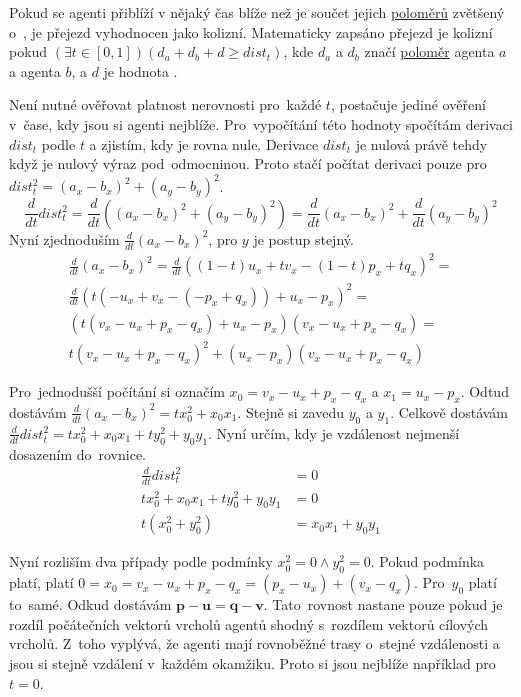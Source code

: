 Pokud se agenti přiblíží v nějaký čas blíže než je součet jejich \hyperref[par:polomer_agenta]{poloměrů}
zvětšený o~, je přejezd vyhodnocen jako kolizní.
Matematicky zapsáno přejezd je kolizní pokud $(\exists t\in[0, 1])(d_a + d_b + d \geq dist_t)$,
kde $d_a$ a $d_b$ značí \hyperref[par:polomer_agent]{poloměr} agenta $a$ a agenta $b$,
a $d$ je hodnota .

Není nutné ověřovat platnost nerovnosti pro~každé $t$, postačuje jediné ověření v~čase, kdy jsou si agenti nejblíže.
Pro~vypočítání této hodnoty spočítám derivaci $dist_t$ podle $t$ a zjistím, kdy je rovna nule.
Derivace $dist_t$ je nulová právě tehdy když je nulový výraz pod~odmocninou.
Proto stačí počítat derivaci pouze pro~$dist^2_t = (a_x - b_x)^2 + (a_y - b_y)^2$.
\[
	\frac{d}{dt} dist^2_t =
	\frac{d}{dt} \left(\left(a_x - b_x\right)^2 + \left(a_y - b_y\right)^2\right) =
	\frac{d}{dt} \left(a_x - b_x\right)^2 + \frac{d}{dt} \left(a_y - b_y\right)^2
\]
Nyní zjednoduším $\frac{d}{dt} (a_x - b_x)^2$, pro $y$ je postup stejný.
\begin{gather*}
	\frac{d}{dt} \left(a_x - b_x\right)^2 =
	\frac{d}{dt} \left(\left(1-t\right)u_x + tv_x - \left(1-t\right)p_x + tq_x\right)^2 =  \\
	\frac{d}{dt} \left(t\left(-u_x + v_x -\left(-p_x + q_x\right)\right) + u_x - p_x\right)^2 =  \\
	\left(t\left(v_x - u_x + p_x - q_x\right) + u_x - p_x\right)\left(v_x - u_x + p_x - q_x\right) =  \\
	t\left(v_x - u_x + p_x - q_x\right)^2 + \left(u_x - p_x\right)\left(v_x - u_x + p_x - q_x\right)
\end{gather*}

Pro~jednodušší počítání si označím $x_0 = v_x - u_x + p_x - q_x$ a $x_1 = u_x - p_x$.
Odtud dostávám $\frac{d}{dt} (a_x - b_x)^2 = tx^2_0 + x_0 x_1$.
Stejně si zavedu $y_0$ a $y_1$.
Celkově dostávám $\frac{d}{dt} dist^2_t = tx^2_0 + x_0 x_1 + ty^2_0 + y_0 y_1$.
Nyní určím, kdy je vzdálenost nejmenší dosazením do~rovnice.
\begin{align*}
	\frac{d}{dt} dist^2_t &= 0 \\
	tx^2_0 + x_0 x_1 + ty^2_0 + y_0 y_1 &= 0 \\
	t\left(x^2_0 + y^2_0\right) &= x_0 x_1 + y_0 y_1
\end{align*}

Nyní rozliším dva případy podle podmínky $x^2_0 = 0 \wedge y^2_0 = 0$.
Pokud podmínka platí, platí $0 = x_0 = v_x - u_x + p_x - q_x = \left(p_x - u_x\right) + \left(v_x - q_x\right)$.
Pro~$y_0$ platí to~samé.
Odkud dostávám $\mathbf{p} - \mathbf{u} = \mathbf{q} - \mathbf{v}$.
Tato~rovnost nastane pouze pokud je rozdíl počátečních vektorů vrcholů agentů shodný s~rozdílem vektorů cílových vrcholů.
Z~toho vyplývá, že agenti mají rovnoběžné trasy o~stejné vzdálenosti a jsou si stejně vzdálení v~každém okamžiku.
Proto si jsou nejblíže například pro~$t = 0$.

